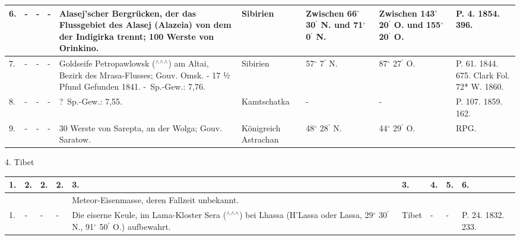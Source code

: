 \documentclass[a4paper, 8pt, oneside, polutonikogreek, german]{article}
\begin{document}
\begin{landscape}
\begin{table}[!ht]
\begin{tabular}{|l|l|l|l|l|l|l|l|l|}
        6. & - & - & - & Alasej’scher Bergrücken, der das Flussgebiet des Alasej (Alazeia) von dem der Indigirka trennt; 100 Werste von Orinkino. & Sibirien & Zwischen 66$^\circ$ 30$^\prime$ N. und 71$^\circ$ 0$^\prime$ N. & Zwischen 143$^\circ$ 20$^\prime$ O. und 155$^\circ$ 20$^\prime$ O. & P. 4. 1854. 396. \\ \hline
        7. & - & - & - & Goldseife Petropawlowsk ($^\wedge$$^\wedge$$^\wedge$) am Altai, Bezirk des Mrasa-Flusses; Gouv. Omsk. - 17 ½ Pfund Gefunden 1841. - Sp.-Gew.: 7,76. & Sibirien & 57$^\circ$ 7$^\prime$ N. & 87$^\circ$ 27$^\prime$ O. & P. 61. 1844. 675. Clark Fol. 72* W. 1860. \\ \hline
        8. & - & - & - & ? Sp.-Gew.: 7,55. & Kamtschatka & - & - & P. 107. 1859. 162. \\ \hline
        9. & - & - & - & 30 Werste von Sarepta, an der Wolga; Gouv. Saratow. & Königreich Astrachan & 48$^\circ$ 28$^\prime$ N. & 44$^\circ$ 29$^\prime$ O. & RPG. \\ \hline
    \end{tabular}
\end{table}
\end{landscape}
\clearpage
\begin{landscape}
4. Tibet
\begin{table}[!ht]
    \centering
    \begin{tabular}{|l|l|l|l|l|l|l|l|l|}
    \hline
        1. & 2. & 2. & 2. & 3. & 3. & 4. & 5. & 6. \\ \hline
          &   &   &   & Meteor-Eisenmasse, deren Fallzeit unbekannt. &   &   &   &   \\ \hline
        1. & - & - & - & Die eiserne Keule, im Lama-Kloster Sera ($^\wedge$$^\wedge$$^\wedge$) bei Lhassa (H’Lassa oder Lassa, 29$^\circ$ 30$^\prime$ N., 91$^\circ$ 50$^\prime$ O.) aufbewahrt. & Tibet & - & - & P. 24. 1832. 233. \\ \hline
    \end{tabular}
\end{table}
\end{landscape}
\clearpage
\end{document}
